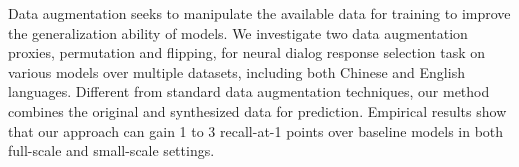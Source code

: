 Data augmentation seeks to manipulate the available data for training to improve the generalization ability of models. We investigate two data augmentation proxies, permutation and flipping, for neural dialog response selection task on various models over multiple datasets, including both Chinese and English languages. Different from standard data augmentation techniques, our method combines the original and synthesized data for prediction. Empirical results show that our approach can gain 1 to 3 recall-at-1 points over baseline models in both full-scale and small-scale settings.
